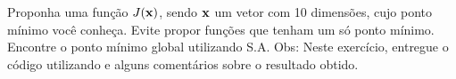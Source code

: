 \documentclass{homeworkclass}
\begin{document}
\begin{homeworkProblem}
Proponha uma função $J(\mathbf{x})$, sendo $\mathbf{x}$ um vetor com 10 dimensões, cujo ponto mínimo você conheça. Evite propor funções que tenham um só ponto mínimo. Encontre o ponto mínimo global utilizando S.A. Obs: Neste exercício, entregue o código utilizando e alguns comentários sobre o resultado obtido.
\end{homeworkProblem}
\end{document}
